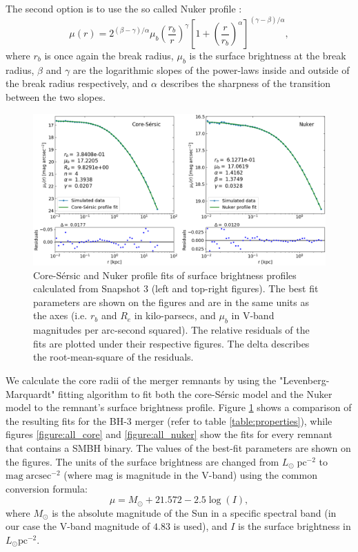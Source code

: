 \documentclass[english, oneside]{HYgradu}
\begin{document}
The second option is to use the so called Nuker profile \citep{Lauer1995}:
\begin{equation}
\mu(r) = 2^{(\beta - \gamma) / \alpha} \mu_b \left( \frac{r_b}{r} \right)^\gamma \left[ 1 + \left( \frac{r}{r_b} \right)^\alpha \right]^{(\gamma - \beta)/\alpha},
\label{eq:nuker}
\end{equation}
where $r_b$ is once again the break radius, $\mu_b$ is the surface brightness at the break radius, $\beta$ and $\gamma$ are the logarithmic slopes of the power-laws inside and outside of the break radius respectively, and $\alpha$ describes the sharpness of the transition between the two slopes.

\begin{figure}[h]
	\centering
	\includegraphics[width=\textwidth]{core_nuker_fits.png}
	\caption{Core-Sérsic and Nuker profile fits of surface brightness profiles calculated from Snapshot 3 (left and top-right figures). The best fit parameters are shown on the figures and are in the same units as the axes (i.e. $r_b$ and $R_e$ in kilo-parsecs, and $\mu_b$ in V-band magnitudes per arc-second squared). The relative residuals of the fits are plotted under their respective figures. The delta describes the root-mean-square of the residuals.}
	\label{figure:core_nuker}
\end{figure}

We calculate the core radii of the merger remnants by using the "Levenberg-Marquardt" fitting algorithm to fit both the core-Sérsic model and the Nuker model to the remnant's surface brightness profile. Figure \ref{figure:core_nuker} shows a comparison of the resulting fits for the BH-3 merger (refer to table \ref{table:properties}), while figures \ref{figure:all_core} and \ref{figure:all_nuker} show the fits for every remnant that contains a SMBH binary. The values of the best-fit parameters are shown on the figures. The units of the surface brightness are changed from $L_\odot \; \mathrm{pc^{-2}}$ to $\mathrm{mag \; arcsec^{-2}}$ (where $\mathrm{mag}$ is magnitude in the V-band) using the common conversion formula:
\begin{equation}
\mu = M_\odot + 21.572 - 2.5 \log(I), 
\end{equation}
where $M_\odot$ is the absolute magnitude of the Sun in a specific spectral band (in our case the V-band magnitude of $4.83$ is used), and $I$ is the surface brightness in $L_\odot \mathrm{pc^{-2}}$.
\end{document}
